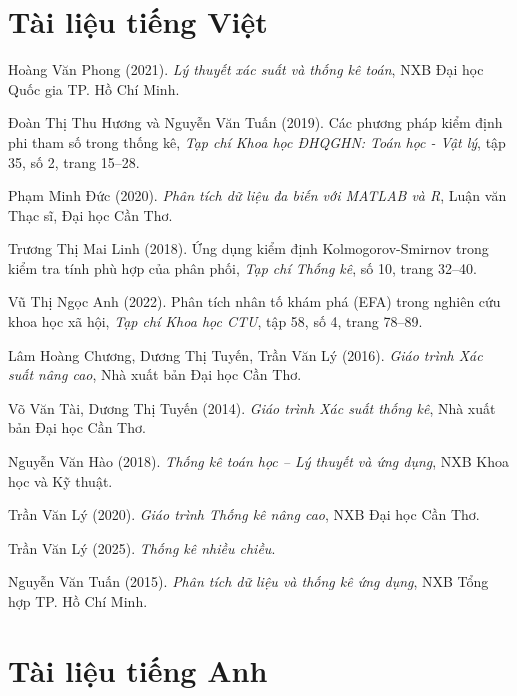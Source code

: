 
\begin{thebibliography}{99}

\section*{Tài liệu tiếng Việt}

 Hoàng Văn Phong (2021). \textit{Lý thuyết xác suất và thống kê toán}, NXB Đại học Quốc gia TP. Hồ Chí Minh.

 Đoàn Thị Thu Hương và Nguyễn Văn Tuấn (2019). Các phương pháp kiểm định phi tham số trong thống kê, \textit{Tạp chí Khoa học ĐHQGHN: Toán học - Vật lý}, tập 35, số 2, trang 15--28.

 Phạm Minh Đức (2020). \textit{Phân tích dữ liệu đa biến với MATLAB và R}, Luận văn Thạc sĩ, Đại học Cần Thơ.

 Trương Thị Mai Linh (2018). Ứng dụng kiểm định Kolmogorov-Smirnov trong kiểm tra tính phù hợp của phân phối, \textit{Tạp chí Thống kê}, số 10, trang 32--40.

 Vũ Thị Ngọc Anh (2022). Phân tích nhân tố khám phá (EFA) trong nghiên cứu khoa học xã hội, \textit{Tạp chí Khoa học CTU}, tập 58, số 4, trang 78--89.

 Lâm Hoàng Chương, Dương Thị Tuyến, Trần Văn Lý (2016). \textit{Giáo trình Xác suất nâng cao}, Nhà xuất bản Đại học Cần Thơ.

 Võ Văn Tài, Dương Thị Tuyến (2014). \textit{Giáo trình Xác suất thống kê}, Nhà xuất bản Đại học Cần Thơ.

 Nguyễn Văn Hào (2018). \textit{Thống kê toán học -- Lý thuyết và ứng dụng}, NXB Khoa học và Kỹ thuật.

 Trần Văn Lý (2020). \textit{Giáo trình Thống kê nâng cao}, NXB Đại học Cần Thơ.

 Trần Văn Lý (2025). \textit{Thống kê nhiều chiều}.

 Nguyễn Văn Tuấn (2015). \textit{Phân tích dữ liệu và thống kê ứng dụng}, NXB Tổng hợp TP. Hồ Chí Minh.

\section*{Tài liệu tiếng Anh}


\end{thebibliography}

